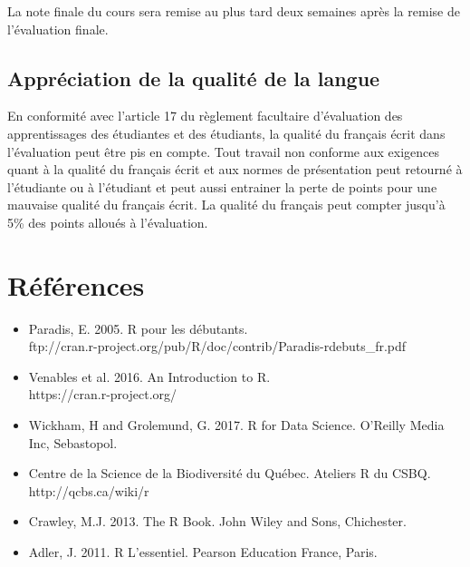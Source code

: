 \documentclass[12]{article}
\begin{document}
    La note finale du cours sera remise au plus tard deux semaines après la
	remise de l'évaluation finale.

    \subsection*{Appréciation de la qualité de la langue}

    En conformité avec l'article 17 du règlement facultaire d'évaluation
    des apprentissages des étudiantes et des étudiants, la qualité du français
    écrit dans l’évaluation peut être pis en compte. Tout travail non conforme
    aux exigences quant à la qualité du français écrit et aux normes de
    présentation  peut retourné à l'étudiante ou à l'étudiant et peut aussi
    entrainer la perte de points pour une mauvaise qualité du français écrit.
    La qualité du français peut compter jusqu'à 5\% des points alloués à
    l'évaluation.

	
	
    
    

	\section*{Références}

	\begin{itemize}
	\renewcommand{\labelitemi}{$\bullet$}

		\item Paradis, E. 2005. R pour les débutants.
		\\ ftp://cran.r-project.org/pub/R/doc/contrib/Paradis-rdebuts\_fr.pdf

		\item Venables et al. 2016. An Introduction to R.
		\\ https://cran.r-project.org/

		\item Wickham, H and Grolemund, G. 2017. R for Data Science. O'Reilly Media Inc, Sebastopol.

		\item Centre de la Science de la Biodiversité du Québec. Ateliers R du CSBQ. \\ http://qcbs.ca/wiki/r

		\item Crawley, M.J. 2013. The R Book. John Wiley and Sons, Chichester.

		\item Adler, J. 2011. R L'essentiel. Pearson Education France, Paris.

	\end{itemize}
\end{document}
